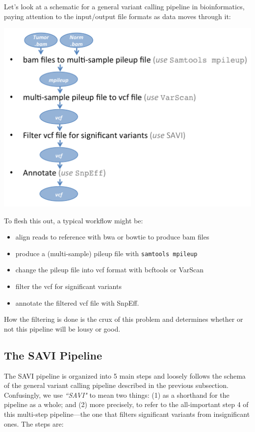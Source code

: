 \documentclass[letterpaper,14pt]{memoir}
\begin{document}
Let's look at a schematic for a general variant calling pipeline in bioinformatics, paying attention to the input/output file formats as data moves through it:

\begin{flushright}
\includegraphics[scale=0.75]{pipeline_507.png}
\end{flushright}

\noindent To flesh this out, a typical workflow might be:

\begin{itemize}
\tightlist
\item
  align reads to reference with bwa or bowtie to produce bam files
\item
  produce a (multi-sample) pileup file with \texttt{samtools mpileup}
\item
  change the pileup file into vcf format with bcftools or VarScan
\item
  filter the vcf for significant variants
\item
  annotate the filtered vcf file with SnpEff.
\end{itemize}

\noindent How the filtering is done is the crux of this problem and determines whether or not this pipeline will be lousy or good.
  
\subsection{The SAVI Pipeline}\label{The SAVI Pipeline}

The SAVI pipeline is organized into 5 main steps and loosely follows the schema of the general variant calling pipeline described in the previous subsection. Confusingly, we use \textit{``SAVI"} to mean two things: (1) as a shorthand for the pipeline as a whole; and (2) more precisely, to refer to the all-important step 4 of this multi-step pipeline---the one that filters significant variants from insignificant ones. The steps are:
\end{document}
